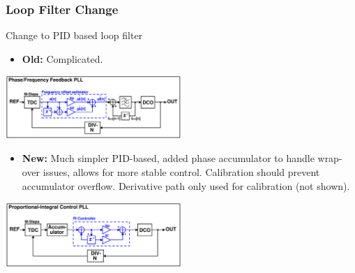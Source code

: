 \documentclass[t, screen, aspectratio=43]{beamer}
\begin{document}
\begin{frame}
	\frametitle{Loop Filter Change}
	\begin{block}{Change to PID based loop filter}
		\vspace{-0.5em}
		\begin{itemize}
			\scriptsize
			\item \textbf{Old:} Complicated.
		\end{itemize} 	
		\vspace{-1em} 
		\center\includegraphics[width=0.5\textwidth, angle=0]{more_advanced.pdf}
		\begin{itemize}
			\scriptsize
			\item \textbf{New:} Much simpler PID-based, added phase accumulator to handle wrap-over issues, allows for more stable control. Calibration should prevent accumulator overflow. Derivative path only used for calibration (not shown).
		\end{itemize}
		\vspace{-1em}
		\center\includegraphics[width=0.5\textwidth, angle=0]{pi_pll.pdf} 
	\end{block}
\end{frame}
\end{document}

